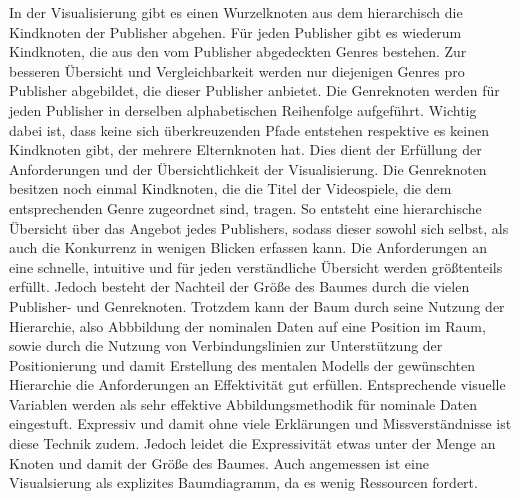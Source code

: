 \documentclass[usegeometry=true]{scrartcl}
\begin{document}
In der Visualisierung gibt es einen Wurzelknoten aus dem hierarchisch die Kindknoten der Publisher abgehen. 
Für jeden Publisher gibt es wiederum Kindknoten, die aus den vom Publisher abgedeckten Genres bestehen. 
Zur besseren Übersicht und Vergleichbarkeit werden nur diejenigen Genres pro Publisher abgebildet, die dieser Publisher anbietet. 
Die Genreknoten werden für jeden Publisher in derselben alphabetischen Reihenfolge aufgeführt. 
Wichtig dabei ist, dass keine sich überkreuzenden Pfade entstehen respektive es keinen Kindknoten gibt, der mehrere Elternknoten hat. 
Dies dient der Erfüllung der Anforderungen und der Übersichtlichkeit der Visualisierung.
Die Genreknoten besitzen noch einmal Kindknoten, die die Titel der Videospiele, die dem entsprechenden Genre zugeordnet sind, tragen. So entsteht eine hierarchische Übersicht über das Angebot jedes Publishers, sodass dieser sowohl sich selbst, als auch die Konkurrenz in wenigen Blicken erfassen kann. 
Die Anforderungen an eine schnelle, intuitive und für jeden verständliche Übersicht werden größtenteils erfüllt. 
Jedoch besteht der Nachteil der Größe des Baumes durch die vielen Publisher- und Genreknoten. 
Trotzdem kann der Baum durch seine Nutzung der Hierarchie, also Abbbildung der nominalen Daten auf eine Position im Raum, sowie durch die Nutzung von Verbindungslinien zur Unterstützung der Positionierung und damit Erstellung des mentalen Modells der gewünschten Hierarchie die Anforderungen an Effektivität gut erfüllen.
Entsprechende visuelle Variablen werden als sehr effektive Abbildungsmethodik für nominale Daten eingestuft. Expressiv und damit ohne viele Erklärungen und Missverständnisse ist diese Technik zudem. %
Jedoch leidet die Expressivität etwas unter der Menge an Knoten und damit der Größe des Baumes.
Auch angemessen ist eine Visualsierung als explizites Baumdiagramm, da es wenig Ressourcen fordert. 
\end{document}
